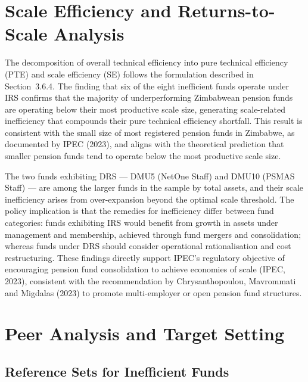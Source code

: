 \documentclass[12pt,a4paper]{article}
\begin{document}
\section{Scale Efficiency and Returns-to-Scale Analysis}

The decomposition of overall technical efficiency into pure technical efficiency (PTE) and scale efficiency (SE) follows the formulation described in Section~3.6.4. The finding that six of the eight inefficient funds operate under IRS confirms that the majority of underperforming Zimbabwean pension funds are operating below their most productive scale size, generating scale-related inefficiency that compounds their pure technical efficiency shortfall. This result is consistent with the small size of most registered pension funds in Zimbabwe, as documented by IPEC (2023), and aligns with the theoretical prediction that smaller pension funds tend to operate below the most productive scale size.

The two funds exhibiting DRS --- DMU5 (NetOne Staff) and DMU10 (PSMAS Staff) --- are among the larger funds in the sample by total assets, and their scale inefficiency arises from over-expansion beyond the optimal scale threshold. The policy implication is that the remedies for inefficiency differ between fund categories: funds exhibiting IRS would benefit from growth in assets under management and membership, achieved through fund mergers and consolidation; whereas funds under DRS should consider operational rationalisation and cost restructuring. These findings directly support IPEC's regulatory objective of encouraging pension fund consolidation to achieve economies of scale (IPEC, 2023), consistent with the recommendation by Chrysanthopoulou, Mavrommati and Migdalas (2023) to promote multi-employer or open pension fund structures.

\section{Peer Analysis and Target Setting}

\subsection{Reference Sets for Inefficient Funds}
\end{document}
